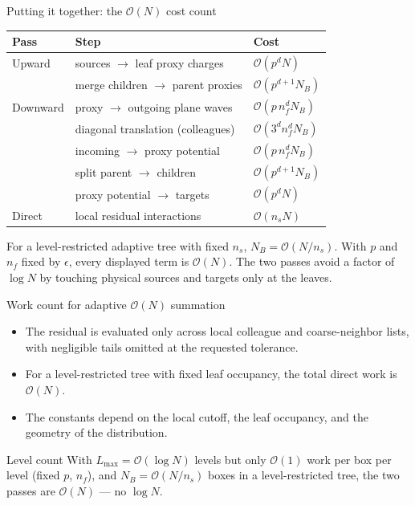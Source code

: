 \documentclass[aspectratio=169,11pt]{beamer}
\newcommand{\cO}{\mathcal{O}}
\begin{document}
\begin{frame}{Putting it together: the \(\cO(N)\) cost count}
\small
\begin{tabular}{@{}lll@{}}
\toprule
Pass & Step & Cost \\
\midrule
Upward & sources \(\to\) leaf proxy charges & \(\cO(p^d N)\)\\
       & merge children \(\to\) parent proxies & \(\cO(p^{d+1} N_B)\)\\
\addlinespace
Downward & proxy \(\to\) outgoing plane waves & \(\cO(p\,n_f^d N_B)\)\\
         & diagonal translation (colleagues) & \(\cO(3^d n_f^d N_B)\)\\
         & incoming \(\to\) proxy potential & \(\cO(p\,n_f^d N_B)\)\\
         & split parent \(\to\) children & \(\cO(p^{d+1} N_B)\)\\
         & proxy potential \(\to\) targets & \(\cO(p^d N)\)\\
\addlinespace
Direct & local residual interactions & \(\cO(n_s N)\)\\
\bottomrule
\end{tabular}
\par\smallskip
\noindent For a level-restricted adaptive tree with fixed \(n_s\), \(N_B=\cO(N/n_s)\). With \(p\) and \(n_f\) fixed by \(\epsilon\), every displayed term is \(\cO(N)\). The two passes avoid a factor of \(\log N\) by touching physical sources and targets only at the leaves.
\end{frame}

\begin{frame}{Work count for adaptive \(\cO(N)\) summation}
\small
\begin{itemize}
  \item The residual is evaluated only across local colleague and coarse-neighbor lists, with negligible tails omitted at the requested tolerance.
  \item For a level-restricted tree with fixed leaf occupancy, the total direct work is \(\cO(N)\).
  \item The constants depend on the local cutoff, the leaf occupancy, and the geometry of the distribution.
\end{itemize}
\begin{block}{Level count}
With \(L_{\max}=\cO(\log N)\) levels but only \(\cO(1)\) work per box per level (fixed \(p\), \(n_f\)), and \(N_B=\cO(N/n_s)\) boxes in a level-restricted tree, the two passes are \(\cO(N)\) --- no \(\log N\).
\end{block}
\end{frame}
\end{document}
